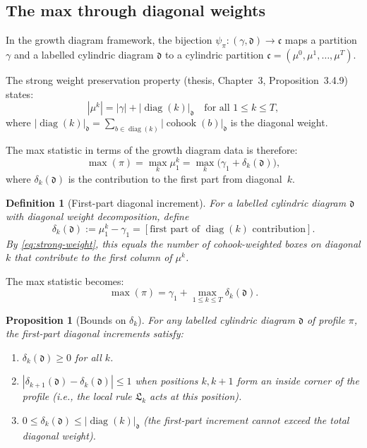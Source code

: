 \documentclass[11pt]{article}
\newtheorem{proposition}[theorem]{Proposition}
\newtheorem{definition}[theorem]{Definition}
\newcommand{\diag}{\operatorname{diag}}
\newcommand{\cohook}{\operatorname{cohook}}
\begin{document}
\subsection{The max through diagonal weights}

In the growth diagram framework, the bijection
$\psi_\pi : (\gamma, \mathfrak{d}) \to \mathfrak{c}$
maps a partition $\gamma$ and a labelled cylindric diagram $\mathfrak{d}$ to a
cylindric partition $\mathfrak{c} = (\mu^0, \mu^1, \ldots, \mu^T)$.

The strong weight preservation property (thesis, Chapter~3, Proposition~3.4.9) states:
\begin{equation}
  |\mu^k| = |\gamma| + |\diag(k)|_{\mathfrak{d}}
  \quad \text{for all } 1 \leq k \leq T,
  \label{eq:strong-weight}
\end{equation}
where $|\diag(k)|_{\mathfrak{d}} = \sum_{b \in \diag(k)} |\cohook(b)|_{\mathfrak{d}}$
is the diagonal weight.

The max statistic in terms of the growth diagram data is therefore:
\begin{equation}
  \max(\pi) = \max_k \mu^k_1 = \max_k \bigl(\gamma_1 + \delta_k(\mathfrak{d})\bigr),
  \label{eq:max-from-diag}
\end{equation}
where $\delta_k(\mathfrak{d})$ is the contribution to the first part from diagonal~$k$.

\begin{definition}[First-part diagonal increment]
\label{def:delta-k}
For a labelled cylindric diagram $\mathfrak{d}$ with diagonal weight decomposition,
define
\[
  \delta_k(\mathfrak{d}) := \mu^k_1 - \gamma_1 = [\text{first part of } \diag(k)
  \text{ contribution}].
\]
By \eqref{eq:strong-weight}, this equals the number of cohook-weighted boxes on
diagonal $k$ that contribute to the first column of $\mu^k$.
\end{definition}

The max statistic becomes:
\[
  \max(\pi) = \gamma_1 + \max_{1 \leq k \leq T} \delta_k(\mathfrak{d}).
\]

\begin{proposition}[Bounds on $\delta_k$]
\label{prop:delta-bounds}
For any labelled cylindric diagram $\mathfrak{d}$ of profile $\pi$, the
first-part diagonal increments satisfy:
\begin{enumerate}
  \item $\delta_k(\mathfrak{d}) \geq 0$ for all $k$.
  \item $|\delta_{k+1}(\mathfrak{d}) - \delta_k(\mathfrak{d})| \leq 1$ when
    positions $k, k+1$ form an inside corner of the profile (i.e., the local
    rule $\mathfrak{L}_k$ acts at this position).
  \item $0 \leq \delta_k(\mathfrak{d}) \leq |\diag(k)|_{\mathfrak{d}}$ (the
    first-part increment cannot exceed the total diagonal weight).
\end{enumerate}
\end{proposition}
\end{document}
